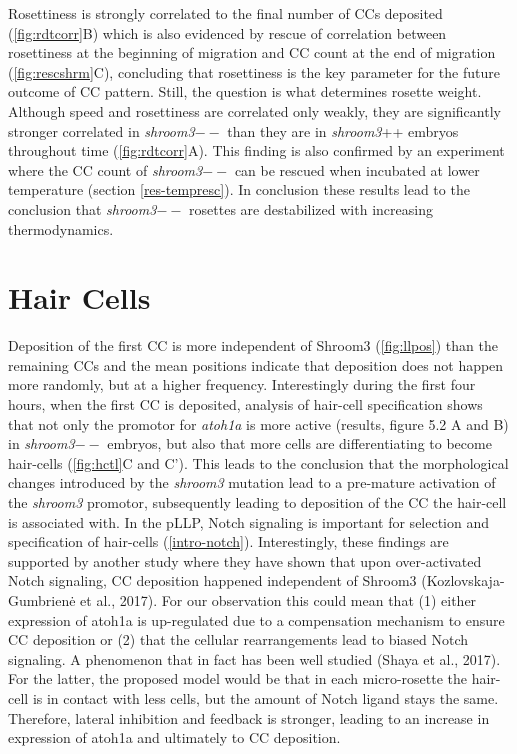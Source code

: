 \documentclass[11pt,singlespacinge,twoside]{reedthesis} %
\begin{document}
Rosettiness is strongly correlated to the final number of CCs deposited (\ref{fig:rdtcorr}B) which is also evidenced by rescue of correlation between rosettiness at the beginning of migration and CC count at the end of migration (\ref{fig:rescshrm}C), concluding that rosettiness is the key parameter for the future outcome of CC pattern. Still, the question is what determines rosette weight. Although speed and rosettiness are correlated only weakly, they are significantly stronger correlated in \emph{shroom3}\(--\) than they are in \emph{shroom3}++ embryos throughout time (\ref{fig:rdtcorr}A). This finding is also confirmed by an experiment where the CC count of \emph{shroom3}\(--\) can be rescued when incubated at lower temperature (section \ref{res-tempresc}). In conclusion these results lead to the conclusion that \emph{shroom3}\(--\) rosettes are destabilized with increasing thermodynamics.

\hypertarget{hair-cells}{%
\section{Hair Cells}\label{hair-cells}}

Deposition of the first CC is more independent of Shroom3 (\ref{fig:llpos}) than the remaining CCs and the mean positions indicate that deposition does not happen more randomly, but at a higher frequency. Interestingly during the first four hours, when the first CC is deposited, analysis of hair-cell specification shows that not only the promotor for \emph{atoh1a} is more active (results, figure 5.2 A and B) in \emph{shroom3}\(--\) embryos, but also that more cells are differentiating to become hair-cells (\ref{fig:hctl}C and C'). This leads to the conclusion that the morphological changes introduced by the \emph{shroom3} mutation lead to a pre-mature activation of the \emph{shroom3} promotor, subsequently leading to deposition of the CC the hair-cell is associated with.
In the pLLP, Notch signaling is important for selection and specification of hair-cells (\ref{intro-notch}). Interestingly, these findings are supported by another study where they have shown that upon over-activated Notch signaling, CC deposition happened independent of Shroom3 (Kozlovskaja-Gumbrienė et al., 2017). For our observation this could mean that (1) either expression of atoh1a is up-regulated due to a compensation mechanism to ensure CC deposition or (2) that the cellular rearrangements lead to biased Notch signaling. A phenomenon that in fact has been well studied (Shaya et al., 2017). For the latter, the proposed model would be that in each micro-rosette the hair-cell is in contact with less cells, but the amount of Notch ligand stays the same. Therefore, lateral inhibition and feedback is stronger, leading to an increase in expression of atoh1a and ultimately to CC deposition.
\end{document}
